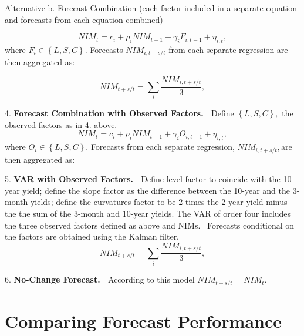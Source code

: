 \documentclass[12pt]{article}
\begin{document}
Alternative b. {\normalsize Forecast Combination (each factor included in a
separate equation and forecasts from each equation combined) }

\begin{equation*}
NIM_{t}=c_{i}+\rho _{i}NIM_{t-1}+\gamma _{i}F_{i,t-1}+{\eta _{i,t},}
\end{equation*}%
where $F_{i}\in \left\{ L,S,C\right\} .$ Forecasts $NIM_{i,t+s/t}$ from each
separate regression are then aggregated as:

\begin{equation*}
NIM_{t+s/t}=\sum_{i}\frac{NIM_{i,t+s/t}}{3},
\end{equation*}


4. \textbf{Forecast Combination with Observed Factors. \ }Define $\left\{
L,S,C\right\} ,$ the observed factors as in 4. above.
\begin{equation*}
NIM_{t}=c_{i}+\rho _{i}NIM_{t-1}+\gamma _{i}O_{i,t-1}+{\eta _{i,t},}
\end{equation*}%
where $O_{i}\in \left\{ L,S,C\right\} .$ Forecasts  from each separate
regression, $NIM_{i,t+s/t},$are then aggregated as:

5. \textbf{VAR with Observed Factors. \ }{\normalsize Define level factor to
coincide with the 10-year yield; define the slope factor as the difference
between the 10-year and the 3-month yields; define the curvatures factor to
be 2 times the 2-year yield minus the the sum of the 3-month and 10-year
yields. }The VAR of order four includes the three observed factors defined
as above and NIMs. \ Forecasts conditional on the factors are obtained using
the Kalman filter.
\begin{equation*}
NIM_{t+s/t}=\sum_{i}\frac{NIM_{i,t+s/t}}{3},
\end{equation*}

6. \textbf{No-Change Forecast. \ }{\normalsize According to this model }$%
NIM_{t+s/t}=NIM_{t}${\normalsize . }




\section{\protect\normalsize Comparing Forecast Performance}

{\normalsize \clearpage
}
\end{document}
